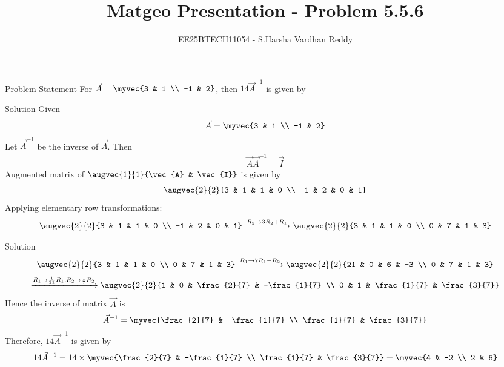 \documentclass{beamer}
\title{Matgeo Presentation - Problem 5.5.6}
\author{EE25BTECH11054 - S.Harsha Vardhan Reddy}
\numberwithin{equation}{section}
\theoremstyle{remark}
\begin{document}
\begin{frame}
  \titlepage
\end{frame}

\begin{frame}{Problem Statement}
For $\vec{A} = \myvec{3 & 1 \\ -1 & 2}$, then $14\vec{A}^{-1}$ is given by
\end{frame}

\begin{frame}{Solution}
Given
\begin{align}
\vec{A} = \myvec{3 & 1 \\ -1 & 2}
\end{align}
Let $\vec{A}^{-1}$ be the inverse of $\vec{A}$. Then
\begin{align}
\vec{A}\vec{A}^{-1} = \vec{I}
\end{align}
Augmented matrix of $\augvec{1}{1}{\vec{A} & \vec{I}}$ is given by
\begin{align}
\augvec{2}{2}{3 & 1 & 1 & 0 \\ -1 & 2 & 0 & 1}
\end{align}
Applying elementary row transformations:
\begin{align}
\augvec{2}{2}{3 & 1 & 1 & 0 \\ -1 & 2 & 0 & 1} \xrightarrow{R_2 \rightarrow 3R_2 + R_1} \augvec{2}{2}{3 & 1 & 1 & 0 \\ 0 & 7 & 1 & 3}
\end{align}
\end{frame}

\begin{frame}{Solution}
\begin{align}
\augvec{2}{2}{3 & 1 & 1 & 0 \\ 0 & 7 & 1 & 3} \xrightarrow{R_1 \rightarrow 7R_1 - R_2} \augvec{2}{2}{21 & 0 & 6 & -3 \\ 0 & 7 & 1 & 3}
\end{align}
\begin{align}
\xrightarrow{R_1 \rightarrow \frac{1}{21}R_1, R_2 \rightarrow \frac{1}{7}R_2} \augvec{2}{2}{1 & 0 & \frac{2}{7} & -\frac{1}{7} \\ 0 & 1 & \frac{1}{7} & \frac{3}{7}}
\end{align}
Hence the inverse of matrix $\vec{A}$ is
\begin{align}
\vec{A}^{-1} = \myvec{\frac{2}{7} & -\frac{1}{7} \\ \frac{1}{7} & \frac{3}{7}}
\end{align}
Therefore, $14\vec{A}^{-1}$ is given by
\begin{align}
14\vec{A}^{-1} = 14 \times \myvec{\frac{2}{7} & -\frac{1}{7} \\ \frac{1}{7} & \frac{3}{7}} = \myvec{4 & -2 \\ 2 & 6}
\end{align}
\end{frame}
\end{document}
